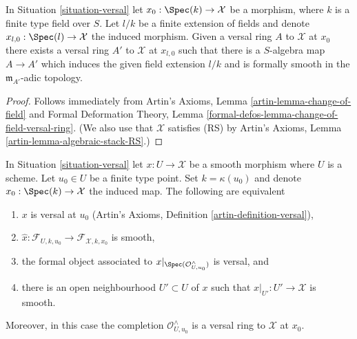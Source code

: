 \begin{lemma}
\label{lemma-versal-ring-field-extension}
In Situation \ref{situation-versal} let $x_0 : \Spec(k) \to \mathcal{X}$
be a morphism, where $k$ is a finite type field over $S$.
Let $l/k$ be a finite extension of fields and denote
$x_{l, 0} : \Spec(l) \to \mathcal{X}$ the induced morphism.
Given a versal ring $A$ to $\mathcal{X}$ at $x_0$ there exists
a versal ring $A'$ to $\mathcal{X}$ at $x_{l, 0}$ such that
there is a $S$-algebra map $A \to A'$ which induces the given
field extension $l/k$ and is formally smooth in the $\mathfrak m_{A'}$-adic
topology.
\end{lemma}

\begin{proof}
Follows immediately from
Artin's Axioms, Lemma \ref{artin-lemma-change-of-field}
and
Formal Deformation Theory, Lemma
\ref{formal-defos-lemma-change-of-field-versal-ring}.
(We also use that $\mathcal{X}$ satisfies (RS) by
Artin's Axioms, Lemma \ref{artin-lemma-algebraic-stack-RS}.)
\end{proof}

\begin{lemma}
\label{lemma-compare-versal-ring-completion}
In Situation \ref{situation-versal} let $x : U \to \mathcal{X}$ be a
smooth morphism where $U$ is a scheme. Let $u_0 \in U$ be a finite type point.
Set $k = \kappa(u_0)$ and denote $x_0 : \Spec(k) \to \mathcal{X}$
the induced map. The following are equivalent
\begin{enumerate}
\item $x$ is versal at $u_0$
(Artin's Axioms, Definition \ref{artin-definition-versal}),
\item $\hat x : \mathcal{F}_{U, k, u_0} \to \mathcal{F}_{\mathcal{X}, k, x_0}$
is smooth,
\item the formal object associated to
$x|_{\Spec(\mathcal{O}_{U, u_0}^\wedge)}$ is versal, and
\item there is an open neighbourhood $U' \subset U$ of $x$ such that
$x|_{U'} : U' \to \mathcal{X}$ is smooth.
\end{enumerate}
Moreover, in this case the completion $\mathcal{O}_{U, u_0}^\wedge$
is a versal ring to $\mathcal{X}$ at $x_0$.
\end{lemma}

